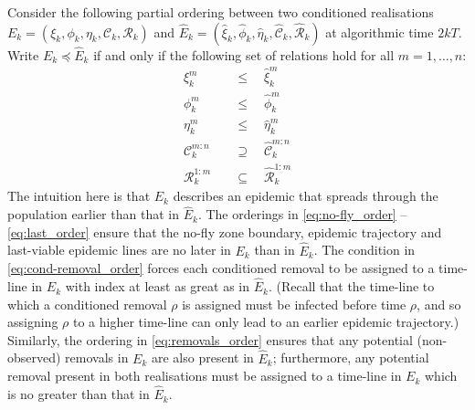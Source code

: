 \documentclass[]{article}
\newcommand{\Conditioned}{\mathcal{C}}
\newcommand{\Epidemic}{E}%
\newcommand{\Removals}{\mathcal{R}}
\newcommand{\ple}{\preceq}
\newcommand{\early}[1]{#1}
\newcommand{\late}[1]{\hat{#1}}
\begin{document}
Consider the following partial ordering between two conditioned realisations
\(\early{\Epidemic}_k = (\early{\xi}_k, \early{\phi}_k, \early{\eta}_k, \early{\Conditioned}_k, \early{\Removals}_k) \) 
and \(\late{\Epidemic}_k= (\late{\xi}_k, \late{\phi}_k, \late{\eta}_k, \late{\Conditioned}_k, \late{\Removals}_k)\) at algorithmic time \(2kT\).
Write \(\early{\Epidemic}_k \ple \late{\Epidemic}_k\) if and only if 
the following set of relations hold for all \(m=1,\dots,n\):
\begin{align}
\early{\xi}^m_k \quad &\le \quad \late{\xi}^m_k \label{eq:no-fly_order} \\
\early{\phi}^m_k\quad &\le \quad \late{\phi}^m_k \label{eq:trajectory_order} \\
\early{\eta}^m_k\quad &\le \quad \late{\eta}^m_k \label{eq:last_order} \\
\early{\Conditioned}^{m:n}_k \quad &\supseteq \quad \late{\Conditioned}^{m:n}_k \label{eq:cond-removal_order} \\
\early{\Removals}^{1:m}_k\quad &\subseteq \quad \late{\Removals}^{1:m}_k \label{eq:removals_order} 
\end{align}
The intuition here is that \(\early{\Epidemic}_k\) 
describes an epidemic that spreads through the population earlier than that in \(\late{\Epidemic}_k\).
The orderings in \eqref{eq:no-fly_order} -- \eqref{eq:last_order} ensure that 
the no-fly zone boundary, epidemic trajectory and last-viable epidemic lines
are no later in \(\early{\Epidemic}_k\) than in \(\late{\Epidemic}_k\). 
The condition in \eqref{eq:cond-removal_order} forces each conditioned removal
to be assigned to a time-line in \(\early{\Epidemic}_k\) with index at least as great as in \(\late{\Epidemic}_k\).
(Recall that the time-line to which a conditioned removal \(\rho\) is assigned must be infected before time \(\rho\), 
and so assigning \(\rho\) to a higher time-line can only lead to an earlier epidemic trajectory.) 
Similarly, the ordering in \eqref{eq:removals_order} ensures that 
any potential (non-observed) removals in \(\early{\Epidemic}_k\) are also present in \(\late{\Epidemic}_k\);
furthermore, any potential removal present in both realisations
must be assigned to a time-line in \(\early{\Epidemic}_k\) which is no greater than that in \(\late{\Epidemic}_k\).
\end{document}
